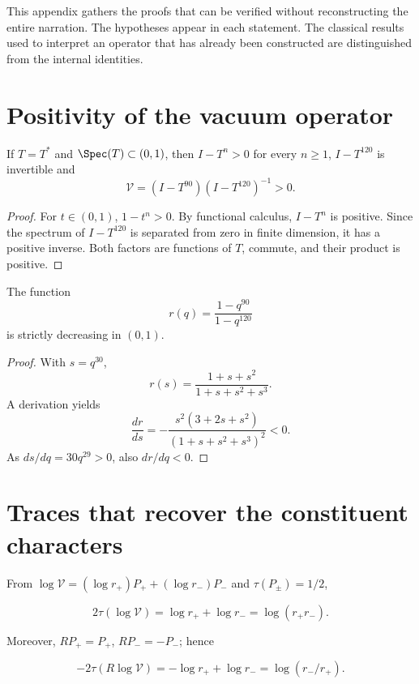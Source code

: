 \label{hmt:p3:app:proofs}

This appendix gathers the proofs that can be verified without reconstructing the entire narration. The hypotheses appear in each statement. The classical results used to interpret an operator that has already been constructed are distinguished from the internal identities.

\section{Positivity of the vacuum operator}

\begin{lemma}
If \(T=T^*\) and \(\Spec(T)\subset(0,1)\), then \(I-T^n>0\) for every \(n\ge1\), \(I-T^{120}\) is invertible and
\[
\mathcal V=(I-T^{90})(I-T^{120})^{-1}>0.
\]
\end{lemma}

\begin{proof}
For \(t\in(0,1)\), \(1-t^n>0\). By functional calculus, \(I-T^n\) is positive. Since the spectrum of \(I-T^{120}\) is separated from zero in finite dimension, it has a positive inverse. Both factors are functions of \(T\), commute, and their product is positive.
\end{proof}

\begin{lemma}
The function
\[
r(q)=\frac{1-q^{90}}{1-q^{120}}
\]
is strictly decreasing in \((0,1)\).
\end{lemma}

\begin{proof}
With \(s=q^{30}\),
\[
r(s)=\frac{1+s+s^2}{1+s+s^2+s^3}.
\]
A derivation yields
\[
\frac{dr}{ds}=
-\frac{s^2(3+2s+s^2)}{(1+s+s^2+s^3)^2}<0.
\]
As \(ds/dq=30q^{29}>0\), also \(dr/dq<0\).
\end{proof}

\section{Traces that recover the constituent characters}

From \(\log\mathcal V=(\log r_+)P_++(\log r_-)P_-\) and \(\tau(P_\pm)=1/2\),

\[
2\tau(\log\mathcal V)=\log r_++\log r_-=\log(r_+r_-).
\]

Moreover, \(RP_+=P_+\), \(RP_-=-P_-\); hence

\[
-2\tau(R\log\mathcal V)
=-\log r_++\log r_-
=\log(r_-/r_+).
\]

